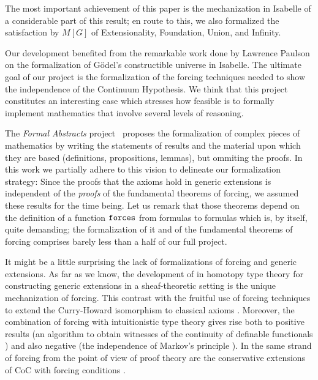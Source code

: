 \medskip
{}
\medskip

The most important achievement of this paper is the
mechanization in Isabelle of a considerable part of this result; en route
to this, we also formalized the satisfaction by $M[G]$ of
Extensionality, Foundation, Union, and Infinity. %

\medskip
{}
\medskip

Our development benefited from the remarkable work done by Lawrence
Paulson \cite{paulson_2003} on the formalization of G\"odel's
constructible universe in Isabelle. The
ultimate goal of our project is the formalization of the forcing
techniques needed to show the independence of the Continuum
Hypothesis. We think that this project constitutes an interesting case
which stresses how feasible is to formally implement mathematics that
involve several levels of reasoning. 

The \emph{Formal Abstracts} project~\cite{hales-fabstracts} proposes
the formalization of complex pieces of mathematics by writing the
statements of 
results and the material upon which they are based (definitions,
propositions, lemmas), but ommiting the proofs. In this work we
partially adhere to this vision to delineate our formalization
strategy:
Since the proofs that the  axioms hold in generic extensions
is independent of the \emph{proofs} of the fundamental theorems of
forcing, we assumed these results for the time being. Let us remark
that those theorems depend on the definition of a function $\mathop{\mathtt{forces}}$
from formulas to formulas which is, by itself, quite demanding; the
formalization of it and of the fundamental theorems of forcing %
comprises barely less than a half of our full project.

It might be a little surprising the lack of formalizations of forcing
and generic extensions. As far as we know, the development of
\citet{JFR6232} in homotopy type theory for constructing generic
extensions in a sheaf-theoretic setting is the unique mechanization of
forcing. This contrast with the fruitful use of forcing techniques to
extend the Curry-Howard isomorphism to classical axioms
\cite{Miquel:2011:FPT:2058525.2059614,lmcs:1070}. Moreover, the
combination of forcing with intuitionistic type theory
\cite{Coquand:2009:FTT:1807662.1807665,coquand2010note} gives rise
both to positive results (an algorithm to obtain witnesses of the
continuity of definable functionals \cite{coquand2012computational})
and also negative (the independence of Markov's principle
\cite{lmcs:3859}). In the same strand of forcing from the point of
view of proof theory \cite{avigad_2004} are the conservative
extensions of CoC with forcing conditions
\cite{jaber:hal-01319066,Jaber:2012:ETT:2358958.2359524}.

